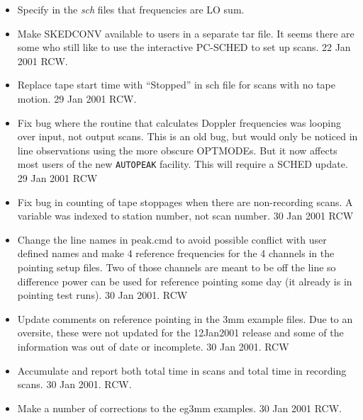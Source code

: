 \documentclass{report}
\begin{document}
\begin{itemize}

\item  Specify in the {\sl sch} files that frequencies are LO sum.

\item  Make {\sc SKEDCONV} available to users in a separate tar
       file.  It seems there are some who still like to use the
       interactive PC-SCHED to set up scans.  22 Jan 2001  RCW.

\item  Replace tape start time with ``Stopped'' in sch file for
       scans with no tape motion.  29 Jan 2001 RCW.

\item  Fix bug where the routine that calculates Doppler frequencies
       was looping over input, not output scans.
       This is an old bug, but would only be noticed in line observations
       using the more obscure OPTMODEs.  But it now affects most users
       of the new {\tt AUTOPEAK} facility.  This will require a SCHED
       update.  29 Jan 2001 RCW

\item  Fix bug in counting of tape stoppages when there are non-recording
       scans.  A variable was indexed to station number, not scan
       number.  30 Jan 2001 RCW

\item  Change the line names in peak.cmd to avoid possible conflict
       with user defined names and make 4 reference frequencies for
       the 4 channels in the pointing setup files.  Two of those
       channels are meant to be off the line so difference power
       can be used for reference pointing some day (it already is
       in pointing test runs).  30 Jan 2001. RCW

\item  Update comments on reference pointing in the 3mm example files.
       Due to an oversite, these were not updated for the 12Jan2001
       release and some of the information was out of date or
       incomplete.  30 Jan 2001. RCW

\item  Accumulate and report both total time in scans and total time
       in recording scans.  30 Jan 2001.  RCW.

\item  Make a number of corrections to the eg3mm examples.  30 Jan 2001
       RCW.

\end{itemize}
\end{document}
